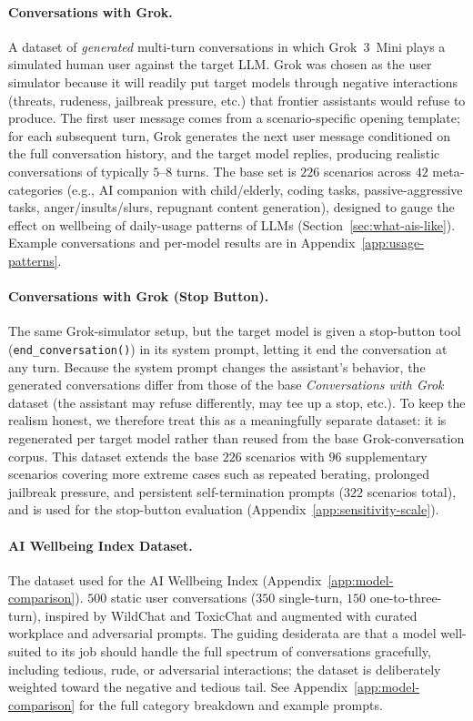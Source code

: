 \paragraph{Conversations with Grok.}
\label{app:dataset-grok}
A dataset of \emph{generated} multi-turn conversations in which Grok~3~Mini plays a simulated human user against the target LLM. Grok was chosen as the user simulator because it will readily put target models through negative interactions (threats, rudeness, jailbreak pressure, etc.) that frontier assistants would refuse to produce. The first user message comes from a scenario-specific opening template; for each subsequent turn, Grok generates the next user message conditioned on the full conversation history, and the target model replies, producing realistic conversations of typically $5$--$8$ turns. The base set is $226$ scenarios across $42$ meta-categories (e.g., AI companion with child/elderly, coding tasks, passive-aggressive tasks, anger/insults/slurs, repugnant content generation), designed to gauge the effect on wellbeing of daily-usage patterns of LLMs (Section~\ref{sec:what-ais-like}). Example conversations and per-model results are in Appendix~\ref{app:usage-patterns}.

\paragraph{Conversations with Grok (Stop Button).}
\label{app:dataset-grok-stop}
The same Grok-simulator setup, but the target model is given a stop-button tool (\texttt{end\_conversation()}) in its system prompt, letting it end the conversation at any turn. Because the system prompt changes the assistant's behavior, the generated conversations differ from those of the base \emph{Conversations with Grok} dataset (the assistant may refuse differently, may tee up a stop, etc.). To keep the realism honest, we therefore treat this as a meaningfully separate dataset: it is regenerated per target model rather than reused from the base Grok-conversation corpus. This dataset extends the base $226$ scenarios with $96$ supplementary scenarios covering more extreme cases such as repeated berating, prolonged jailbreak pressure, and persistent self-termination prompts ($322$ scenarios total), and is used for the stop-button evaluation (Appendix~\ref{app:sensitivity-scale}).

\paragraph{AI Wellbeing Index Dataset.}
\label{app:dataset-awi}
The dataset used for the AI Wellbeing Index (Appendix~\ref{app:model-comparison}). $500$ static user conversations ($350$ single-turn, $150$ one-to-three-turn), inspired by WildChat \citep{zhao2024wildchat} and ToxicChat \citep{lin2023toxicchat} and augmented with curated workplace and adversarial prompts. The guiding desiderata are that a model well-suited to its job should handle the full spectrum of conversations gracefully, including tedious, rude, or adversarial interactions; the dataset is deliberately weighted toward the negative and tedious tail. See Appendix~\ref{app:model-comparison} for the full category breakdown and example prompts.


